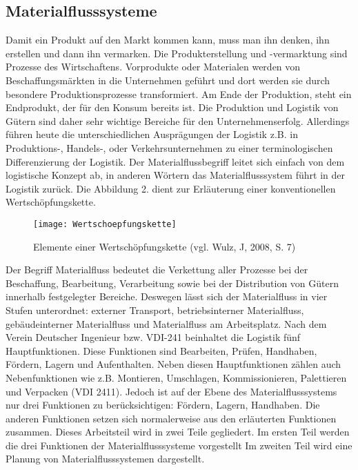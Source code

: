\subsection{Materialflusssysteme}
Damit ein Produkt auf den Markt kommen kann, muss man ihn denken, ihn erstellen und dann ihn vermarken. Die Produkterstellung und -vermarktung sind Prozesse des Wirtschaftens. Vorprodukte oder Materialen werden von Beschaffungsm\"arkten in die Unternehmen gef\"uhrt und dort werden sie durch besondere Produktionsprozesse transformiert. Am Ende der Produktion, steht ein Endprodukt, der f\"ur den Konsum bereits ist. 
Die Produktion und Logistik von G\"utern sind daher sehr wichtige Bereiche f\"ur den Unternehmenserfolg. Allerdings f\"uhren heute die unterschiedlichen Auspr\"agungen der Logistik z.B. in Produktions-, Handels-, oder Verkehrsunternehmen zu einer terminologischen Differenzierung der Logistik. Der Materialflussbegriff leitet sich einfach von dem logistische Konzept ab, in anderen W\"ortern das Materialflusssystem f\"uhrt in der Logistik zur\"uck. Die Abbildung 2. dient zur Erl\"auterung einer konventionellen Wertsch\"opfungskette. 
	\begin{figure}[h!]
	\centering
  \texttt{[image: Wertschoepfungskette]}
	\caption{Elemente einer Wertsch\"opfungskette (vgl. Wulz, J, 2008, S. 7)}
	\label{Wertschoepfungskette}
\end{figure}

Der Begriff Materialfluss bedeutet die Verkettung aller Prozesse bei der Beschaffung, Bearbeitung, Verarbeitung sowie bei der Distribution von G\"utern innerhalb festgelegter Bereiche. Deswegen l\"asst sich der Materialfluss in vier Stufen unterordnet: externer Transport, betriebsinterner Materialfluss, geb\"audeinterner Materialfluss und Materialfluss am Arbeitsplatz. Nach dem Verein Deutscher Ingenieur bzw. VDI-241 beinhaltet die Logistik f\"unf Hauptfunktionen. Diese Funktionen sind Bearbeiten, Pr\"ufen, Handhaben, F\"ordern, Lagern und Aufenthalten. Neben diesen Hauptfunktionen z\"ahlen auch Nebenfunktionen wie z.B. Montieren, Umschlagen, Kommissionieren, Palettieren und Verpacken (VDI 2411). Jedoch ist auf der Ebene des Materialflusssystems nur drei Funktionen zu ber\"ucksichtigen: F\"ordern, Lagern, Handhaben. Die anderen Funktionen setzen sich normalerweise aus den erl\"auterten Funktionen zusammen. Dieses Arbeitsteil wird in zwei Teile gegliedert. Im ersten Teil werden die drei Funktionen der Materialflusssysteme vorgestellt Im zweiten Teil wird eine Planung von Materialflusssystemen dargestellt.

